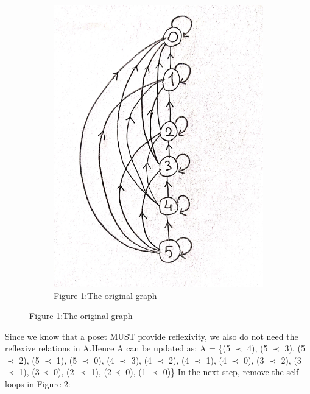 \documentclass[a4 paper]{article}
\numberwithin{equation}{section}
\newcommand{\0}{\mathbf{0}}
\begin{document}
\begin{figure}[h!]
  \centering
  \begin{subfigure}[b]{0.4\linewidth}
    \includegraphics[width=\linewidth]{fig1.png}
    \caption{Figure 1:The original graph}
  \end{subfigure}
\end{figure}
\newpage
Since we know that a poset MUST provide reflexivity, we also do not need the reflexive relations in A.Hence A can be updated as:
A = \{(5 $\prec$ 4), (5 $\prec$ 3), (5 $\prec$ 2), (5 $\prec$ 1), (5 $\prec$ 0), (4 $\prec$ 3), (4 $\prec$ 2), (4 $\prec$ 1), (4 $\prec$ 0), (3 $\prec$ 2), (3 $\prec$ 1), (3$\prec$ 0),  (2 $\prec$ 1), (2$\prec$ 0), (1 $\prec$ 0)\}
\newline
In the next step, remove the self-loops in Figure 2:
\end{document}
